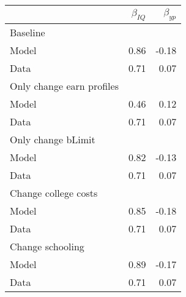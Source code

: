 \begin{tabular}{lrr}
\hline
  & $\beta_{IQ}$  & $\beta_{yp}$  \\
\hline
Baseline &   &   \\
Model & 0.86  & -0.18  \\
Data & 0.71  & 0.07  \\
Only change earn profiles &   &   \\
Model & 0.46  & 0.12  \\
Data & 0.71  & 0.07  \\
Only change bLimit &   &   \\
Model & 0.82  & -0.13  \\
Data & 0.71  & 0.07  \\
Change college costs &   &   \\
Model & 0.85  & -0.18  \\
Data & 0.71  & 0.07  \\
Change schooling &   &   \\
Model & 0.89  & -0.17  \\
Data & 0.71  & 0.07  \\
\hline
\end{tabular}%
